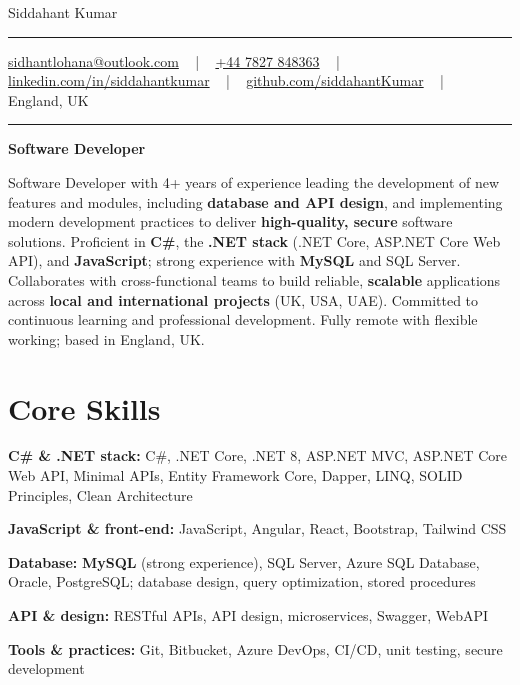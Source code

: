\documentclass[letterpaper,10pt]{article}
\newcommand{\documentTitle}[2]{
  \begin{center}
    \vspace*{-0.3in}
    {\Huge\color{accentTitle} #1}
    \vspace{8pt}
    {\color{accentLine} \hrule}
    \vspace{2pt}
    \footnotesize{#2}
    \vspace{2pt}
    {\color{accentLine} \hrule}
  \end{center}
}
\newenvironment{resume_list}{
  \vspace{-7pt}
  \begin{itemize}[itemsep=-2px, parsep=1pt, leftmargin=30pt]
}{
  \end{itemize}
}
\begin{document}
\documentTitle{Siddahant Kumar}{
\vspace{0.1cm}
\href{mailto:sidhantlohana@outlook.com}{sidhantlohana@outlook.com} ~ | ~
\href{tel:+447827848363}{+44 7827 848363} ~ | ~
\href{https://www.linkedin.com/in/siddahantkumar/}{linkedin.com/in/siddahantkumar} ~ | ~
\href{https://github.com/siddahantKumar}{github.com/siddahantKumar} ~ | ~
England, UK
}

\begin{center}
\textbf{Software Developer}
\end{center}

Software Developer with 4+ years of experience leading the development of new features and modules, including \textbf{database and API design}, and implementing modern development practices to deliver \textbf{high-quality, secure} software solutions. Proficient in \textbf{C\#}, the \textbf{.NET stack} (.NET Core, ASP.NET Core Web API), and \textbf{JavaScript}; strong experience with \textbf{MySQL} and SQL Server. Collaborates with cross-functional teams to build reliable, \textbf{scalable} applications across \textbf{local and international projects} (UK, USA, UAE). Committed to continuous learning and professional development. Fully remote with flexible working; based in England, UK.


\section{Core Skills}

\begin{resume_list}
    \item \textbf{C\# \& .NET stack:} C\#, .NET Core, .NET 8, ASP.NET MVC, ASP.NET Core Web API, Minimal APIs, Entity Framework Core, Dapper, LINQ, SOLID Principles, Clean Architecture
    \item \textbf{JavaScript \& front-end:} JavaScript, Angular, React, Bootstrap, Tailwind CSS
    \item \textbf{Database:} \textbf{MySQL} (strong experience), SQL Server, Azure SQL Database, Oracle, PostgreSQL; database design, query optimization, stored procedures
    \item \textbf{API \& design:} RESTful APIs, API design, microservices, Swagger, WebAPI
    \item \textbf{Tools \& practices:} Git, Bitbucket, Azure DevOps, CI/CD, unit testing, secure development
\end{resume_list}
\end{document}
